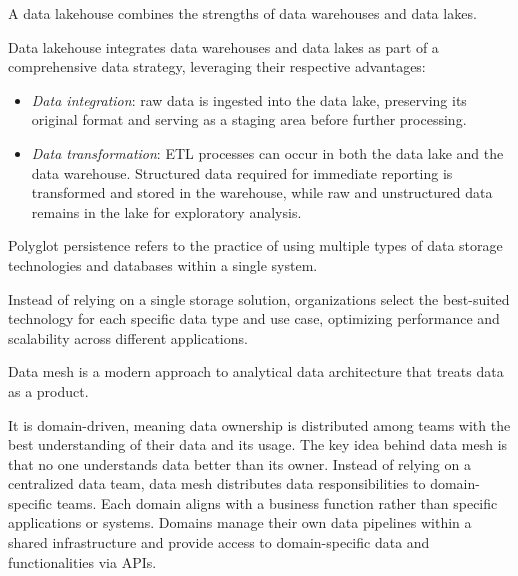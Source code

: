 \begin{definition}
    A data lakehouse combines the strengths of data warehouses and data lakes.
\end{definition}
\noindent Data lakehouse integrates data warehouses and data lakes as part of a comprehensive data strategy, leveraging their respective advantages:
\begin{itemize}
    \item \textit{Data integration}: raw data is ingested into the data lake, preserving its original format and serving as a staging area before further processing.
    \item \textit{Data transformation}: ETL processes can occur in both the data lake and the data warehouse. 
        Structured data required for immediate reporting is transformed and stored in the warehouse, while raw and unstructured data remains in the lake for exploratory analysis.
\end{itemize}

\begin{definition}
    Polyglot persistence refers to the practice of using multiple types of data storage technologies and databases within a single system.
\end{definition}
\noindent Instead of relying on a single storage solution, organizations select the best-suited technology for each specific data type and use case, optimizing performance and scalability across different applications.

\begin{definition}
    Data mesh is a modern approach to analytical data architecture that treats data as a product.
\end{definition}
\noindent It is domain-driven, meaning data ownership is distributed among teams with the best understanding of their data and its usage.
The key idea behind data mesh is that no one understands data better than its owner. Instead of relying on a centralized data team, data mesh distributes data responsibilities to domain-specific teams. 
Each domain aligns with a business function rather than specific applications or systems. 
Domains manage their own data pipelines within a shared infrastructure and provide access to domain-specific data and functionalities via APIs.

